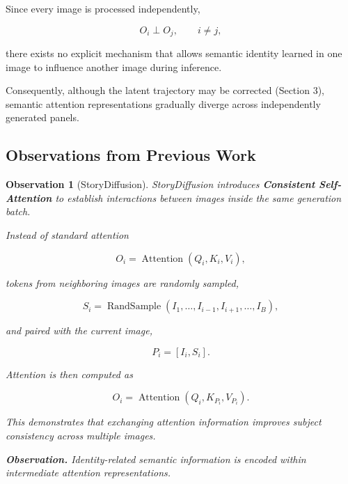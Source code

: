 \documentclass[12pt]{article}
\DeclareMathOperator{\Attention}{Attention}
\DeclareMathOperator{\RandSample}{RandSample}
\newtheorem{observation}{Observation}
\begin{document}
Since every image is processed independently,

\begin{equation}
O_i \perp O_j, \qquad i \neq j,
\end{equation}

there exists no explicit mechanism that allows semantic identity learned in one image to influence another image during inference.

Consequently, although the latent trajectory may be corrected (Section 3), semantic attention representations gradually diverge across independently generated panels.

\subsection{Observations from Previous Work}

\begin{observation}[StoryDiffusion]
StoryDiffusion introduces \textbf{Consistent Self-Attention} to establish interactions between images inside the same generation batch.

Instead of standard attention

\begin{equation}
O_i = \Attention(Q_i, K_i, V_i),
\tag{15}
\end{equation}

tokens from neighboring images are randomly sampled,

\begin{equation}
S_i = \RandSample(I_1, \ldots, I_{i-1}, I_{i+1}, \ldots, I_B),
\tag{16}
\end{equation}

and paired with the current image,

\begin{equation}
P_i = [I_i, S_i].
\tag{17}
\end{equation}

Attention is then computed as

\begin{equation}
O_i = \Attention(Q_i, K_{P_i}, V_{P_i}).
\tag{18}
\end{equation}

This demonstrates that exchanging attention information improves subject consistency across multiple images.

\noindent \textbf{Observation.} Identity-related semantic information is encoded within intermediate attention representations.
\end{observation}
\end{document}
